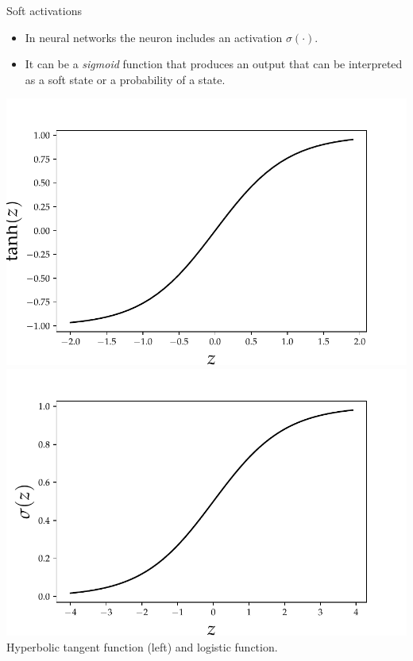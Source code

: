 \documentclass{beamer}
\begin{document}
\begin{frame}{Soft activations}
    \begin{itemize}
        \item In neural networks the neuron includes an activation $\sigma(\cdot)$. 
        \item It can be a \emph{sigmoid} function that  produces an output that can be interpreted as a soft state or a probability of a state. 
    \end{itemize}

    \begin{center}
    \includegraphics[scale=0.39]{Module 1 (NN)/pics/tanh.pdf}
    \includegraphics[scale=0.39]{Module 1 (NN)/pics/logistic.pdf}
    \tiny{Hyperbolic tangent function (left) and logistic function.}

    \end{center}
    
    
    
\end{frame}
\end{document}
